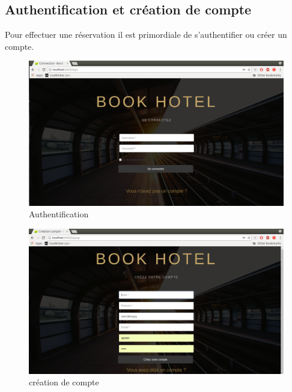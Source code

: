 \documentclass[12pt,a4paper]{report}
\begin{document}
	\subsection{Authentification et création de compte}
Pour effectuer une réservation il est primordiale de s'authentifier ou créer un compte.
	\vspace{2cm}
	\begin{figure}[!hbtp]
		\centering
		\includegraphics[scale=0.2]{./graphics/login.png}
		\caption{Authentification}
		\end{figure}
	\begin{figure}[!hbtp]
		\centering
		\includegraphics[scale=0.2]{./graphics/signup.png}
		\caption{création de compte}
		\end{figure}
		\newpage
\end{document}
